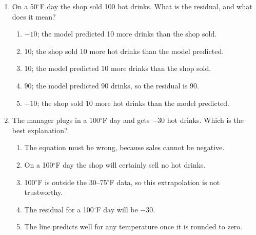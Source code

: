 \documentclass[12pt]{article}
\begin{document}
\begin{enumerate}[leftmargin=1.9em, itemsep=0.05in]

  \item On a 50$^\circ$F day the shop sold 100 hot drinks. What is the residual, and what
        does it mean?
        \begin{enumerate}[label=\textbf{(\Alph*)}, leftmargin=2.2em, itemsep=0pt]
          \item $-10$; the model predicted 10 more drinks than the shop sold.
          \item $10$; the shop sold 10 more hot drinks than the model predicted.
          \item $10$; the model predicted 10 more drinks than the shop sold.
          \item $90$; the model predicted 90 drinks, so the residual is 90.
          \item $-10$; the shop sold 10 more hot drinks than the model predicted.
                \hfill{}\rule[-0.2in]{0pt}{0.48in}
        \end{enumerate}

  \item The manager plugs in a 100$^\circ$F day and gets $-30$ hot drinks. Which is the best
        explanation?
        \begin{enumerate}[label=\textbf{(\Alph*)}, leftmargin=2.2em, itemsep=0pt]
          \item The equation must be wrong, because sales cannot be negative.
          \item On a 100$^\circ$F day the shop will certainly sell no hot drinks.
          \item 100$^\circ$F is outside the 30--75$^\circ$F data, so this extrapolation is
                not trustworthy.
          \item The residual for a 100$^\circ$F day will be $-30$.
          \item The line predicts well for any temperature once it is rounded to zero.
                \hfill{}\rule[-0.2in]{0pt}{0.48in}
        \end{enumerate}

\end{enumerate}

\vspace{0.02in}
\end{document}
